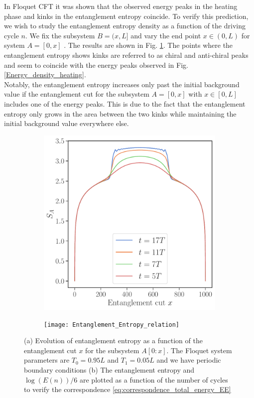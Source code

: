 \documentclass[11pt, a4paper, oneside]{book}
\theoremstyle{definition} %
\begin{document}
In Floquet CFT it was shown \cite{Fan} that the observed energy peaks in the heating phase and kinks in the entanglement entropy coincide. To verify this prediction, we wish to study the entanglement entropy density as a function of the driving cycle $n$. We fix the subsystem $B = (x, L]$ and vary the end point $x \in (0,L)$ for system $A = [0,x]$ . The results are shown in Fig. \ref{EntanglementEvolution}. The points where the entanglement entropy shows kinks are referred to as chiral and anti-chiral peaks and seem to coincide with the energy peaks observed in Fig. \ref{Energy_density_heating}. \\


Notably, the entanglement entropy increases only past the initial background value if the entanglement cut for the subsystem $A = [0,x]$ with $x \in [0,L]$ includes one of the energy peaks. This is due to the fact that the entanglement entropy only grows in the area between the two kinks while maintaining the initial background value everywhere else.

\begin{figure}[h]
\centering
\begin{subfigure}[t]{0.49\textwidth}
	\centering
	\includegraphics[width =\textwidth]{Entanglement_Entropy}
	\caption{}
	\label{EntanglementEvolution}
\end{subfigure}
\begin{subfigure}[t]{0.49\textwidth}
	\centering
	\texttt{[image: Entanglement\_Entropy\_relation]}
	\caption{}
	\label{Entanglement_relation-energy}
\end{subfigure}
\caption{(a) Evolution of entanglement entropy as a function of the entanglement cut $x$ for the subsystem $A[0:x]$. The Floquet system parameters are $T_0 = 0.95L$ and $T_1=0.05L$ and we have periodic boundary conditions (b) The entanglement entropy and $\log(E(n))/6$ are plotted as a function of the number of cycles to verify the correspondence \ref{eq:correspondence_total_energy_EE}}
\end{figure}
\end{document}
